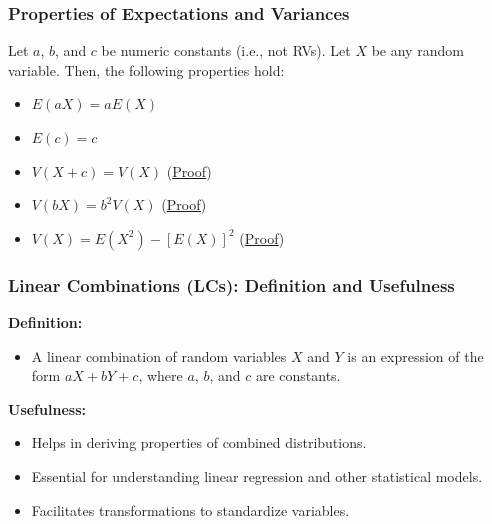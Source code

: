 \documentclass[handout]{beamer} %
\begin{document}
\begin{frame} %
\frametitle{Properties of Expectations and Variances}

Let $a$, $b$, and $c$ be numeric constants (i.e., not RVs). Let $X$ be any random variable. Then, the following properties hold:

\vspace{1em}
\begin{itemize}
    \item $E(aX) = aE(X)$
  \pause
    \item $E(c) = c$
  \pause
    \item $V(X + c) = V(X)$  \hspace{6.0em} (\href{https://statproofbook.github.io/P/var-inv}{Proof})
  \pause
    \item $V(bX) = b^2 V(X)$ \hspace{6.2em} (\href{https://statproofbook.github.io/P/var-scal}{Proof})
  \pause
    \item $V(X) = E(X^2) - [E(X)]^2 $ \hspace{2.9em} (\href{https://statproofbook.github.io/P/var-mean}{Proof})
\end{itemize}

\end{frame}

\begin{frame} %
\frametitle{Linear Combinations (LCs): Definition and Usefulness}

\textbf{Definition:}
\begin{itemize}
    \item A linear combination of random variables $X$ and $Y$ is an expression of the form $aX + bY + c$, where $a$, $b$, and $c$ are constants.
\end{itemize}
  \pause

\textbf{Usefulness:}
\begin{itemize}
    \item Helps in deriving properties of combined distributions.
  \pause
    \item Essential for understanding linear regression and other statistical models.
  \pause
    \item Facilitates transformations to standardize variables.
\end{itemize}

\end{frame}
\end{document}
